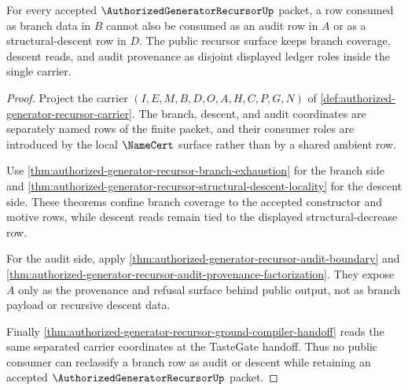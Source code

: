 \begin{theorem}
\label{thm:authorized-generator-recursor-branch-ledger-disjointness}
For every accepted $\AuthorizedGeneratorRecursorUp$ packet, a row consumed as
branch data in $B$ cannot also be consumed as an audit row in $A$ or as a
structural-descent row in $D$. The public recursor surface keeps branch
coverage, descent reads, and audit provenance as disjoint displayed ledger
roles inside the single carrier.
\end{theorem}
\begin{proof}
Project the carrier
$(I,E,M,B,D,O,A,H,C,P,G,N)$ of
\autoref{def:authorized-generator-recursor-carrier}. The branch, descent, and
audit coordinates are separately named rows of the finite packet, and their
consumer roles are introduced by the local $\NameCert$ surface rather than by a
shared ambient row.

Use \autoref{thm:authorized-generator-recursor-branch-exhaustion} for the
branch side and
\autoref{thm:authorized-generator-recursor-structural-descent-locality} for
the descent side. These theorems confine branch coverage to the accepted
constructor and motive rows, while descent reads remain tied to the displayed
structural-decrease row.

For the audit side, apply
\autoref{thm:authorized-generator-recursor-audit-boundary} and
\autoref{thm:authorized-generator-recursor-audit-provenance-factorization}.
They expose $A$ only as the provenance and refusal surface behind public
output, not as branch payload or recursive descent data.

Finally
\autoref{thm:authorized-generator-recursor-ground-compiler-handoff} reads the
same separated carrier coordinates at the TasteGate handoff. Thus no public
consumer can reclassify a branch row as audit or descent while retaining an
accepted $\AuthorizedGeneratorRecursorUp$ packet.
\end{proof}

